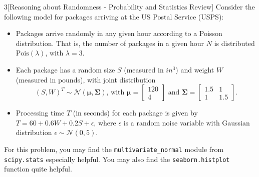 \documentclass[expanded]{pset}
\begin{document}
\begin{problem}{3}[Reasoning about Randomness - Probability and Statistics Review]
Consider the following model for packages arriving at the US Postal Service (USPS):
\begin{itemize}
    \item Packages arrive randomly in any given hour according to a Poisson distribution. That is, the number of packages in a given hour $N$ is distributed $\textrm{Pois}(\lambda)$, with $\lambda = 3$.
    \item Each package has a random size $S$ (measured in $in^3$) and weight $W$ (measured in pounds), with joint distribution
    $$(S, W)^{T} \sim \mathcal{N}\left( \boldsymbol{\mu}, \boldsymbol{\Sigma}\right) \text{, with } \boldsymbol{\mu} = \begin{bmatrix} 120 \\ 4 \end{bmatrix} \text{ and } \boldsymbol{\Sigma} = \begin{bmatrix} 1.5 & 1 \\ 1 & 1.5 \end{bmatrix}.$$
    \item Processing time $T$ (in seconds) for each package is given by $T = 60 + 0.6 W + 0.2 S + \epsilon$, where $\epsilon$ is a random noise variable with Gaussian distribution $\epsilon \sim \mathcal{N}(0, 5)$.
\end{itemize}
For this problem, you may find the \texttt{multivariate\_normal} module from \texttt{scipy.stats} especially helpful. You may also find the \texttt{seaborn.histplot} function quite helpful. 
\end{problem}
\end{document}
